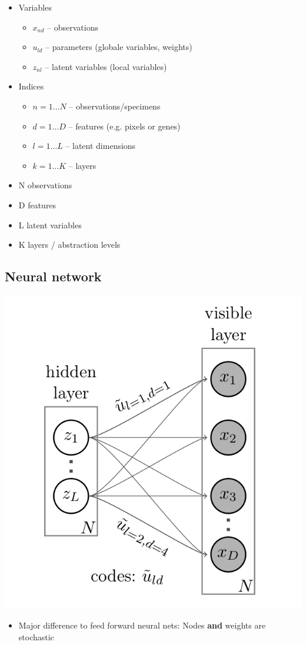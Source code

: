 \documentclass[11pt]{article}
\begin{document}
\begin{itemize}
\item Variables
\begin{itemize}
\item ${x_{nd}}$ -- observations
\item ${u_{ld}}$ -- parameters (globale variables, weights)
\item ${z_{nl}}$ -- latent variables (local variables)
\end{itemize}
\item Indices
\begin{itemize}
\item ${n = 1\ldots N}$ -- observations/specimens
\item ${d = 1\ldots D}$ -- features (e.g. pixels or genes)
\item ${l = 1\ldots L}$ -- latent dimensions
\item ${k = 1\ldots K}$ -- layers
\end{itemize}
\item N observations
\item D features
\item L latent variables
\item K layers / abstraction levels
\end{itemize}

\subsection*{Neural network}
\label{sec-1-2}
\includegraphics[width=.9\linewidth]{./single_layer_network.png}
\begin{itemize}
\item Major difference to feed forward neural nets: Nodes \textbf{and} weights are stochastic
\end{itemize}
\end{document}
